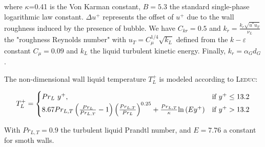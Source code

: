 where $\kappa$=0.41 is the Von Karman constant, $B=5.3$ the standard single-phase logarithmic law constant. $\Delta u^{+}$ represents the offset of $u^{+}$ due to the wall roughness induced by the presence of bubble. We have $C_{kr}=0.5$ and $k_{r}=\displaystyle \frac{k_{r}\sqrt{u^{*}u_{T}}}{\nu_{L}}$ the "roughness Reynolds number" with $u_{T}=C_{\mu}^{1/4}\sqrt{k_{L}}$ defined from the $k-\varepsilon$ constant $C_{\mu}=0.09$ and $k_{L}$ the liquid turbulent kinetic energy. Finally, $k_{r}=\alpha_{G}d_{G}$.

The non-dimensional wall liquid temperature $T_{L}^{+}$ is modeled according to \textsc{Leduc}\cite{Leduc1995}:

\begin{equation}
\label{eq:wall_law} 
  T_{L}^{+}=\begin{cases}
    Pr_{L}~y^{+}, & \text{if $y^{+}\leq 13.2$}\\
    8.67Pr_{L,T}\left(  \frac{Pr_{L}}{Pr_{L,T}}-1  \right) \left( \frac{Pr_{L,T}}{Pr_{L}}  \right)^{0.25} + \frac{Pr_{L,T}}{\kappa}\mathrm{ln}\left( Ey^{+} \right)  & \text{\text{if $y^{+}>13.2$}}
  \end{cases}
\end{equation}

With $Pr_{L,T}=0.9$ the turbulent liquid Prandtl number, and $E=7.76$ a constant for smoth walls.